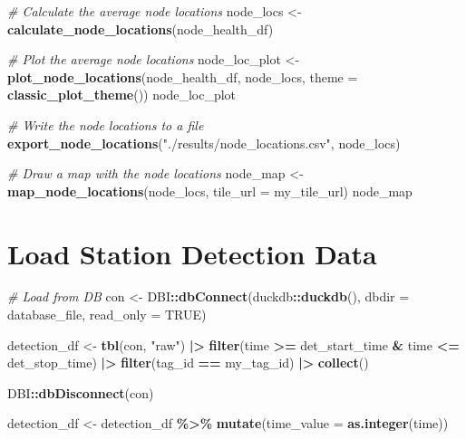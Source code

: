 \documentclass[
]{book}
\newenvironment{Shaded}{\begin{snugshade}}{\end{snugshade}}
\newcommand{\AttributeTok}[1]{\textcolor[rgb]{0.13,0.29,0.53}{#1}}
\newcommand{\CommentTok}[1]{\textcolor[rgb]{0.56,0.35,0.01}{\textit{#1}}}
\newcommand{\ConstantTok}[1]{\textcolor[rgb]{0.56,0.35,0.01}{#1}}
\newcommand{\FunctionTok}[1]{\textcolor[rgb]{0.13,0.29,0.53}{\textbf{#1}}}
\newcommand{\NormalTok}[1]{#1}
\newcommand{\OtherTok}[1]{\textcolor[rgb]{0.56,0.35,0.01}{#1}}
\newcommand{\SpecialCharTok}[1]{\textcolor[rgb]{0.81,0.36,0.00}{\textbf{#1}}}
\newcommand{\StringTok}[1]{\textcolor[rgb]{0.31,0.60,0.02}{#1}}
\begin{document}
\begin{Shaded}
\begin{Highlighting}[]
\CommentTok{\# Calculate the average node locations}
\NormalTok{node\_locs }\OtherTok{\textless{}{-}} \FunctionTok{calculate\_node\_locations}\NormalTok{(node\_health\_df)}

\CommentTok{\# Plot the average node locations}
\NormalTok{node\_loc\_plot }\OtherTok{\textless{}{-}} \FunctionTok{plot\_node\_locations}\NormalTok{(node\_health\_df,}
\NormalTok{                                     node\_locs,}
                                     \AttributeTok{theme =} \FunctionTok{classic\_plot\_theme}\NormalTok{())}
\NormalTok{node\_loc\_plot}

\CommentTok{\# Write the node locations to a file}
\FunctionTok{export\_node\_locations}\NormalTok{(}\StringTok{"./results/node\_locations.csv"}\NormalTok{, node\_locs)}

\CommentTok{\# Draw a map with the node locations}
\NormalTok{node\_map }\OtherTok{\textless{}{-}} \FunctionTok{map\_node\_locations}\NormalTok{(node\_locs, }\AttributeTok{tile\_url =}\NormalTok{ my\_tile\_url)}
\NormalTok{node\_map}
\end{Highlighting}
\end{Shaded}

\section{Load Station Detection Data}\label{load-station-detection-data-1}

\begin{Shaded}
\begin{Highlighting}[]
\CommentTok{\# Load from DB}
\NormalTok{con }\OtherTok{\textless{}{-}}\NormalTok{ DBI}\SpecialCharTok{::}\FunctionTok{dbConnect}\NormalTok{(duckdb}\SpecialCharTok{::}\FunctionTok{duckdb}\NormalTok{(), }
                      \AttributeTok{dbdir =}\NormalTok{ database\_file, }
                      \AttributeTok{read\_only =} \ConstantTok{TRUE}\NormalTok{)}

\NormalTok{detection\_df }\OtherTok{\textless{}{-}} \FunctionTok{tbl}\NormalTok{(con, }\StringTok{"raw"}\NormalTok{) }\SpecialCharTok{|\textgreater{}}
  \FunctionTok{filter}\NormalTok{(time }\SpecialCharTok{\textgreater{}=}\NormalTok{ det\_start\_time }\SpecialCharTok{\&}\NormalTok{ time }\SpecialCharTok{\textless{}=}\NormalTok{ det\_stop\_time) }\SpecialCharTok{|\textgreater{}}
  \FunctionTok{filter}\NormalTok{(tag\_id }\SpecialCharTok{==}\NormalTok{ my\_tag\_id) }\SpecialCharTok{|\textgreater{}}
  \FunctionTok{collect}\NormalTok{()}

\NormalTok{DBI}\SpecialCharTok{::}\FunctionTok{dbDisconnect}\NormalTok{(con)}

\NormalTok{detection\_df }\OtherTok{\textless{}{-}}\NormalTok{ detection\_df }\SpecialCharTok{\%\textgreater{}\%} \FunctionTok{mutate}\NormalTok{(}\AttributeTok{time\_value =} \FunctionTok{as.integer}\NormalTok{(time))}
\end{Highlighting}
\end{Shaded}
\end{document}
